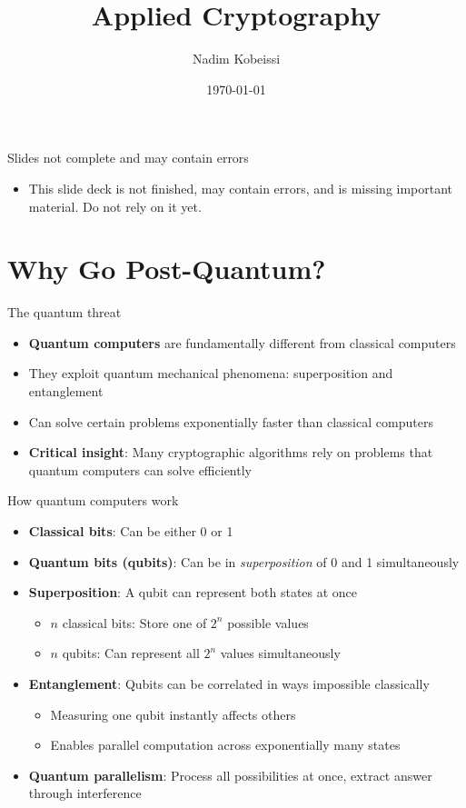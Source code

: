 \documentclass[aspectratio=169, lualatex, handout]{beamer}
\title{Applied Cryptography}
\author{Nadim Kobeissi}
\institute{American University of Beirut}
\date{\today}
\begin{document}
\begin{frame}[plain]
	\titlepage
\end{frame}

\begin{frame}{Slides not complete and may contain errors}
	\begin{itemize}
		\item This slide deck is not finished, may contain errors, and is missing important material. Do not rely on it yet.
	\end{itemize}
\end{frame}

\section{Why Go Post-Quantum?}

\begin{frame}{The quantum threat}
	\begin{itemize}
		\item \textbf{Quantum computers} are fundamentally different from classical computers
		\item They exploit quantum mechanical phenomena: superposition and entanglement
		\item Can solve certain problems exponentially faster than classical computers
		\item \textbf{Critical insight}: Many cryptographic algorithms rely on problems that quantum computers can solve efficiently
	\end{itemize}
\end{frame}

\begin{frame}{How quantum computers work}
	\begin{itemize}
		\item \textbf{Classical bits}: Can be either 0 or 1
		\item \textbf{Quantum bits (qubits)}: Can be in \textit{superposition} of 0 and 1 simultaneously
		\item \textbf{Superposition}: A qubit can represent both states at once
		      \begin{itemize}
			      \item $n$ classical bits: Store one of $2^n$ possible values
			      \item $n$ qubits: Can represent all $2^n$ values simultaneously
		      \end{itemize}
		\item \textbf{Entanglement}: Qubits can be correlated in ways impossible classically
		      \begin{itemize}
			      \item Measuring one qubit instantly affects others
			      \item Enables parallel computation across exponentially many states
		      \end{itemize}
		\item \textbf{Quantum parallelism}: Process all possibilities at once, extract answer through interference
	\end{itemize}
\end{frame}
\end{document}
